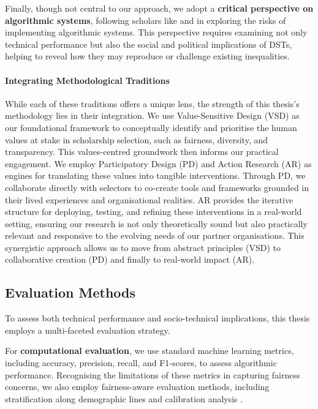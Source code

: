 Finally, though not central to our approach, we adopt a \textbf{critical perspective on algorithmic systems}, following scholars like \textcite{noble2018algorithms} and \textcite{oneill2016weapons} in exploring the risks of implementing algorithmic systems. This perspective requires examining not only technical performance but also the social and political implications of DSTs, helping to reveal how they may reproduce or challenge existing inequalities.

\paragraph{Integrating Methodological Traditions}
While each of these traditions offers a unique lens, the strength of this thesis's methodology lies in their integration. We use Value-Sensitive Design (VSD) as our foundational framework to conceptually identify and prioritise the human values at stake in scholarship selection, such as fairness, diversity, and transparency. This values-centred groundwork then informs our practical engagement. We employ Participatory Design (PD) and Action Research (AR) as engines for translating these values into tangible interventions. Through PD, we collaborate directly with selectors to co-create tools and frameworks grounded in their lived experiences and organisational realities. AR provides the iterative structure for deploying, testing, and refining these interventions in a real-world setting, ensuring our research is not only theoretically sound but also practically relevant and responsive to the evolving needs of our partner organisations. This synergistic approach allows us to move from abstract principles (VSD) to collaborative creation (PD) and finally to real-world impact (AR).

\subsection{Evaluation Methods}\label{ssec:context_evaluation_methods}
To assess both technical performance and socio-technical implications, this thesis employs a multi-faceted evaluation strategy.

For \textbf{computational evaluation}, we use standard machine learning metrics, including accuracy, precision, recall, and F1-scores, to assess algorithmic performance. Recognising the limitations of these metrics in capturing fairness concerns, we also employ fairness-aware evaluation methods, including stratification along demographic lines and calibration analysis \cite{mehrabi2021survey}.

